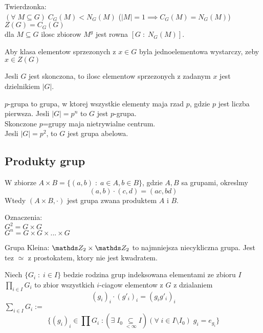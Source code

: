 \begin{multicols}{2}
    Twierdzonka:\smallskip\\
    \point $(\forall\; M\subseteq G)\;C_G(M)<N_G(M)$ ($|M| = 1\implies C_G(M)=N_G(M)$)\smallskip\\
    \point $Z(G)=C_G(G)$\smallskip\\
    \point dla $M\subseteq G$ ilosc zbiorow $M^g$ jest rowna $[G\;:\;N_G(M)]$.\medskip

    Aby klasa elementow sprzezonych z $x\in G$ byla jednoelementowa wystarczy, zeby $x\in Z(G)$\medskip
    
    Jesli $G$ jest skonczona, to ilosc elementow sprzezonych z zadanym $x$ jest dzielnikiem $|G|$.\medskip

    {\color{acc}$p$-grupa} to grupa, w ktorej wszystkie elementy maja rzad $p$, gdzie $p$ jest liczba pierwsza. Jesli $|G|=p^n$ to $G$ jest $p$-grupa.\smallskip\\
    Skonczone $p$=grupy maja {\color{acc}nietrywialne centrum}.\smallskip\\
    Jesli $|G|=p^2$, to $G$ jest grupa abelowa.

\end{multicols}\bigskip

\bigskip

\subsection{Produkty grup}
\begin{multicols*}{2}
    W zbiorze $A\times B=\{(a, b)\;:\;a\in A,b\in B\}$, gdzie $A,B$ sa grupami, okreslmy
    $$(a,b)\cdot(c,d)=(ac, bd)$$
    Wtedy $(A\times B,\cdot)$ jest grupa zwana {\color{def}produktem} $A$ i $B$.
    \medskip

    {\color{acc}Oznaczenia:}\smallskip\\
    \point $G^2=G\times G$\smallskip\\
    \point $G^n=G\times G\times...\times G$
    \medskip

    {\color{def}Grupa Kleina}: $\Z_2\times\Z_2$ to najmniejsza niecykliczna grupa. Jest tez $\simeq$ z prostokatem, ktory nie jest kwadratem.
    \medskip

    \medskip

    Niech $\{G_i\;:\;i\in I\}$ bedzie rodzina grup indeksowana elementami ze zbioru $I$\smallskip\\
    \point $\prod\limits_{i\in I} G_i$ to zbior wszystkich $i$-ciagow elementow z $G$ z dzialaniem
    $$(g_i)_i\cdot(g'_i)_i=(g_ig'_i)_i$$
    \point $\sum\limits_{i\in I}G_i:=$
    $$\{(g_i)_i\in\prod G_i\;:(\exists\;I_0\underset{<\infty}{\subseteq} I)(\forall\;i\in I\setminus I_0)\;g_i=e_{g_i}\}$$
\end{multicols*}